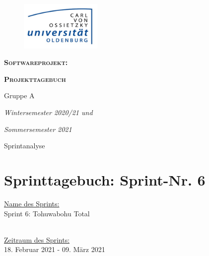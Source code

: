 \documentclass[12pt,a4paper, oneside]{article}
\author{Uni Oldenburg, SWP2020 Gruppe A}
\begin{document}
\begin{titlepage}									
\pagestyle{empty}									
\begin{center}

\begin{figure}[h]									
\centering											
\includegraphics[width=0.35\textwidth]{../img/Logo.jpg}
\end{figure}		

\bigskip \bigskip \noindent							
\textsc{\textbf{\LARGE Softwareprojekt:}} \par \bigskip \noindent																			
\textsc{\textbf{\LARGE Projekttagebuch}} 			    
													
													
\par \bigskip \bigskip \bigskip \bigskip \bigskip \noindent
{\Large Gruppe A} \par \medskip \noindent
		
\par \bigskip \bigskip \bigskip \bigskip \bigskip \bigskip \noindent																		
\textit{\Large Wintersemester 2020/21 und} \par \noindent
\textit{\Large Sommersemester 2021}				
													
\par \bigskip \bigskip \bigskip \bigskip \bigskip \bigskip \noindent			
\par \bigskip \bigskip \bigskip \noindent
{\Large Sprintanalyse} \par \medskip \noindent
		
\end{center}
\end{titlepage}

\tableofcontents
\pagebreak



\section{Sprinttagebuch: Sprint-Nr. 6}
\underline{Name des Sprints:}
\\
Sprint 6: Tohuwabohu Total

\noindent
\\
\underline{Zeitraum des Sprints:} 
\\
18. Februar 2021 - 09. März 2021
\end{document}
